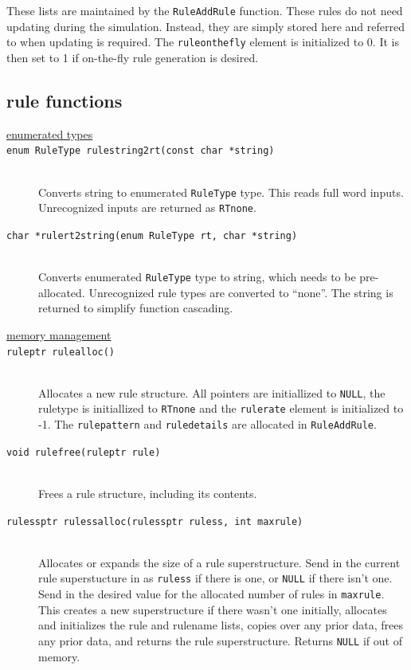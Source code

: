 \documentclass {scrbook}
\newcommand {\ttt} {\texttt}
\begin{document}
These lists are maintained by the \ttt{RuleAddRule} function. These rules do not need updating during the simulation. Instead, they are simply stored here and referred to when updating is required. The \ttt{ruleonthefly} element is initialized to 0. It is then set to 1 if on-the-fly rule generation is desired.

\subsection{rule functions}

\begin{description}

\item[\underline{enumerated types}]

\item[\ttt{enum RuleType rulestring2rt(const char *string)}]
\hfill \\
Converts string to enumerated \ttt{RuleType} type. This reads full word inputs. Unrecognized inputs are returned as \ttt{RTnone}.

\item[\ttt{char *rulert2string(enum RuleType rt, char *string)}]
\hfill \\
Converts enumerated \ttt{RuleType} type to string, which needs to be pre-allocated. Unrecognized rule types are converted to ``none''. The string is returned to simplify function cascading.

\item[\underline{memory management}]

\item[\ttt{ruleptr rulealloc()}]
\hfill \\
Allocates a new rule structure. All pointers are initiallized to \ttt{NULL}, the ruletype is initiallized to \ttt{RTnone} and the \ttt{rulerate} element is initialized to -1. The \ttt{rulepattern} and \ttt{ruledetails} are allocated in \ttt{RuleAddRule}.

\item[\ttt{void rulefree(ruleptr rule)}]
\hfill \\
Frees a rule structure, including its contents.

\item[\ttt{rulessptr rulessalloc(rulessptr ruless, int maxrule)}]
\hfill \\
Allocates or expands the size of a rule superstructure. Send in the current rule superstucture in as \ttt{ruless} if there is one, or \ttt{NULL} if there isn't one. Send in the desired value for the allocated number of rules in \ttt{maxrule}. This creates a new superstructure if there wasn't one initially, allocates and initializes the rule and rulename lists, copies over any prior data, frees any prior data, and returns the rule superstructure. Returns \ttt{NULL} if out of memory.


\end{description}
\end{document}
